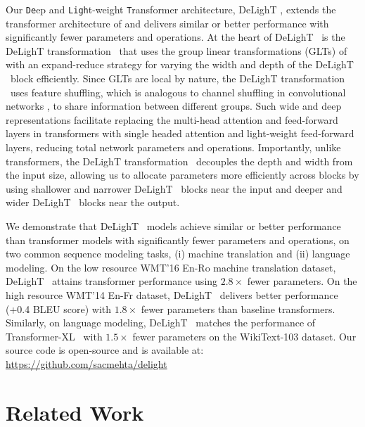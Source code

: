Our \texttt{De}ep and \texttt{Ligh}t-weight \texttt{T}ransformer architecture, DeLighT , extends the transformer architecture of \citet{vaswani2017attention} and delivers similar or better performance with significantly fewer parameters and operations. At the heart of DeLighT ~is the DeLighT transformation ~that uses the group linear transformations (GLTs) of \citet{mehta2018pyramidal} with an expand-reduce strategy for varying the width and depth of the DeLighT ~block efficiently. Since GLTs are local by nature, the DeLighT transformation ~uses feature shuffling, which is analogous to channel shuffling in convolutional networks \citep{zhang2018shufflenet}, to share information between different groups. Such wide and deep representations facilitate replacing the multi-head attention and feed-forward layers in transformers with single headed attention and light-weight feed-forward layers, reducing total network parameters and operations. Importantly, unlike transformers, the DeLighT transformation ~decouples the depth and width from the input size, allowing us to allocate parameters more efficiently across blocks by using shallower and narrower DeLighT ~blocks near the input and deeper and wider DeLighT ~blocks near the output.

We demonstrate that DeLighT ~models achieve similar or better performance than transformer models with significantly fewer parameters and operations, on two common sequence modeling tasks, (i) machine translation and (ii)  language modeling. On the low resource WMT'16 En-Ro machine translation dataset, DeLighT ~attains transformer performance using $2.8\times$ fewer parameters. On the high resource WMT'14 En-Fr dataset, DeLighT ~delivers better performance (+0.4 BLEU score) with $1.8\times$ fewer parameters than baseline transformers. Similarly, on language modeling, DeLighT ~matches the performance of  Transformer-XL~\citep{dai2019transformer} with $1.5\times$ fewer parameters on the WikiText-103 dataset. Our source code is open-source and is available at: \textcolor{blue}{\url{https://github.com/sacmehta/delight}}

\section{Related Work}
\label{sec:related_work}

